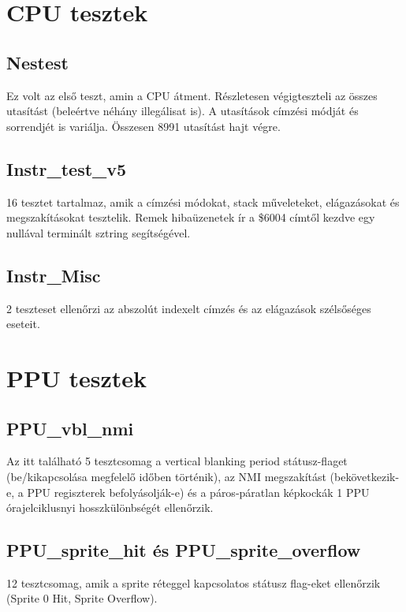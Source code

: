 \section{CPU tesztek}

\subsection{Nestest}
Ez volt az első teszt, amin a CPU átment. Részletesen végigteszteli az összes utasítást (beleértve néhány illegálisat is). A utasítások címzési módját és sorrendjét is variálja. Összesen 8991 utasítást hajt végre.

\subsection{Instr\_test\_v5}
16 tesztet tartalmaz, amik a címzési módokat, stack műveleteket, elágazásokat és megszakításokat tesztelik. Remek hibaüzenetek ír a \$6004 címtől kezdve egy nullával terminált sztring segítségével.

\subsection{Instr\_Misc}
2 teszteset ellenőrzi az abszolút indexelt címzés és az elágazások szélsőséges eseteit.

\section{PPU tesztek}

\subsection{PPU\_vbl\_nmi}
Az itt található 5 tesztcsomag a vertical blanking period státusz-flaget (be/kikapcsolása megfelelő időben történik), az NMI megszakítást (bekövetkezik-e, a PPU regiszterek befolyásolják-e) és a páros-páratlan képkockák 1 PPU órajelciklusnyi hosszkülönbségét ellenőrzik.

\subsection{PPU\_sprite\_hit és PPU\_sprite\_overflow}
12 tesztcsomag, amik a sprite réteggel kapcsolatos státusz flag-eket ellenőrzik (Sprite 0 Hit, Sprite Overflow).




